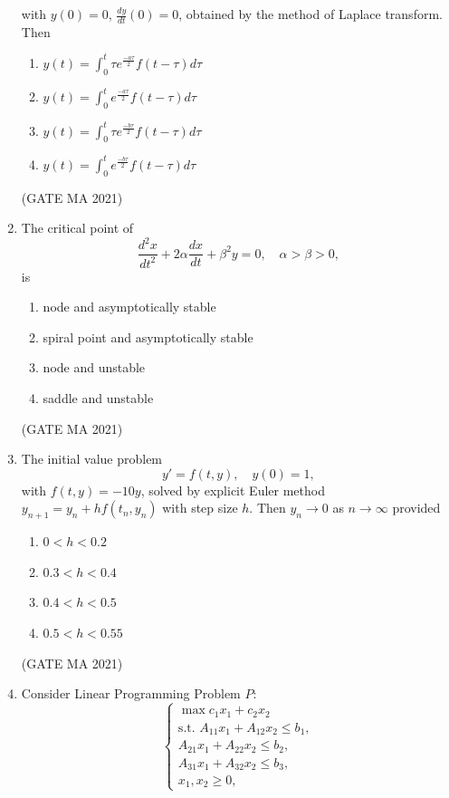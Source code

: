 \documentclass[journal,12pt,onecolumn]{IEEEtran}
\theoremstyle{remark}
\begin{document}
\begin{enumerate}
$$    $$
    with $y(0) = 0$, $\frac{dy}{dt}(0) = 0$, obtained by the method of Laplace transform. Then
    \begin{enumerate}
        \item $y(t)=\int_0^t\tau e^{\frac{-a\tau}{2}}f(t-\tau) d\tau$
        \item $y(t)=\int_0^t e^{\frac{-a\tau}{2}}f(t-\tau)d\tau$
        \item $y(t)=\int_0^t\tau e^{\frac{-b\tau}{2}}f(t-\tau) d\tau$
        \item $y(t)=\int_0^t e^{\frac{-b\tau}{2}}f(t-\tau) d\tau$
    \end{enumerate}
\hfill(GATE MA 2021)
    \item The critical point of
    $$
    \frac{d^2 x}{dt^2} + 2 \alpha \frac{dx}{dt} + \beta^2 y = 0, \quad \alpha > \beta > 0,
    $$
    is
    \begin{enumerate}
        \item node and asymptotically stable
        \item spiral point and asymptotically stable
        \item node and unstable
        \item saddle and unstable
    \end{enumerate}
\hfill(GATE MA 2021)
    \item The initial value problem
    $$
    y' = f(t,y), \quad y(0) = 1,
    $$
    with $f(t,y) = -10 y$, solved by explicit Euler method $y_{n+1} = y_n + h f(t_n,y_n)$ with step size $h$. Then $y_n \to 0$ as $n \to \infty$ provided
    \begin{enumerate}
        \item $0 < h < 0.2$
        \item $0.3 < h < 0.4$
        \item $0.4 < h < 0.5$
        \item $0.5 < h < 0.55$
    \end{enumerate}
\hfill(GATE MA 2021)
    \item Consider Linear Programming Problem $P$:
    $$
    \begin{cases}
    \max c_1 x_1 + c_2 x_2 \\
    \text{s.t. } A_{11} x_1 + A_{12} x_2 \leq b_1, \\
    A_{21} x_1 + A_{22} x_2 \leq b_2, \\
    A_{31} x_1 + A_{32} x_2 \leq b_3, \\
    x_1, x_2 \geq 0,
    \end{cases}
    $$

\end{enumerate}
\end{document}
